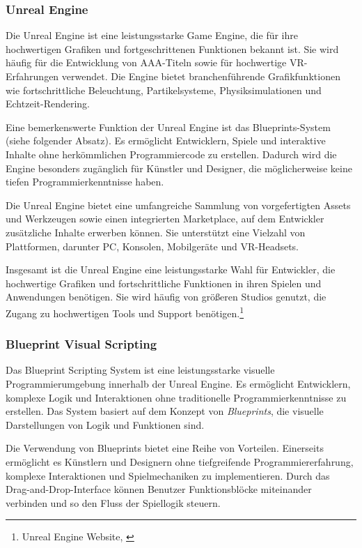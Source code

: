 \subsubsection{Unreal Engine}
Die Unreal Engine ist eine leistungsstarke Game Engine, die für ihre hochwertigen Grafiken und fortgeschrittenen Funktionen
bekannt ist. Sie wird häufig für die Entwicklung von AAA-Titeln sowie für hochwertige VR-Erfahrungen verwendet. Die Engine
bietet branchenführende Grafikfunktionen wie fortschrittliche Beleuchtung, Partikelsysteme, Physiksimulationen und Echtzeit-Rendering.

Eine bemerkenswerte Funktion der Unreal Engine ist das Blueprints-System (siehe folgender Absatz). Es ermöglicht Entwicklern, Spiele und interaktive
Inhalte ohne herkömmlichen Programmiercode zu erstellen. Dadurch wird die Engine besonders zugänglich für Künstler und
Designer, die möglicherweise keine tiefen Programmierkenntnisse haben.

Die Unreal Engine bietet eine umfangreiche Sammlung von vorgefertigten Assets und Werkzeugen sowie einen integrierten
Marketplace, auf dem Entwickler zusätzliche Inhalte erwerben können. Sie unterstützt eine Vielzahl von Plattformen,
darunter PC, Konsolen, Mobilgeräte und VR-Headsets.

Insgesamt ist die Unreal Engine eine leistungsstarke Wahl für Entwickler, die hochwertige Grafiken und fortschrittliche
Funktionen in ihren Spielen und Anwendungen benötigen. Sie wird häufig von größeren Studios genutzt, die Zugang zu hochwertigen
Tools und Support benötigen.\footnote{Unreal Engine Website, \cite{https://www.unrealengine.com/}}

\subsubsection*{Blueprint Visual Scripting}
Das Blueprint Scripting System ist eine leistungsstarke visuelle Programmierumgebung innerhalb der Unreal Engine. Es
ermöglicht Entwicklern, komplexe Logik und Interaktionen ohne traditionelle Programmierkenntnisse zu erstellen. Das System
basiert auf dem Konzept von \textit{Blueprints}, die visuelle Darstellungen von Logik und Funktionen sind.

Die Verwendung von Blueprints bietet eine Reihe von Vorteilen. Einerseits ermöglicht es Künstlern und Designern ohne
tiefgreifende Programmiererfahrung, komplexe Interaktionen und Spielmechaniken zu implementieren. Durch das Drag-and-Drop-Interface
können Benutzer Funktionsblöcke miteinander verbinden und so den Fluss der Spiellogik steuern.

